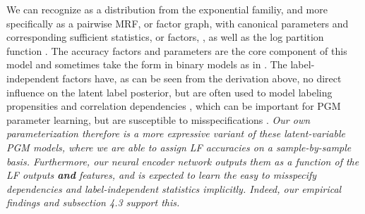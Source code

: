 \documentclass{article}
\begin{document}
We can recognize  as a distribution from the exponential familiy, and more specifically as a pairwise MRF, or factor graph, with canonical parameters  and corresponding sufficient statistics, or factors, , as well as the log partition function .
The accuracy factors and parameters  are the core component of this model and sometimes take the form  in binary models as in \cite{DP, triplets, TripletsMean}.
The label-independent factors  have, as can be seen from the derivation above, no direct influence on the latent label posterior, but are often used to model labeling propensities  and correlation dependencies , which can be important for PGM parameter learning, but are susceptible to misspecifications \cite{structureLearning2, TripletsMean, MisspecificationInDP}.
\emph{Our own parameterization therefore is a more expressive variant of these latent-variable PGM models, where we are able to assign LF accuracies on a sample-by-sample basis. Furthermore, our neural encoder network outputs them as a function of the LF outputs \textbf{and} features, and is expected to learn the easy to misspecify dependencies and label-independent statistics implicitly. Indeed, our empirical findings and subsection 4.3 support this.}
\end{document}
